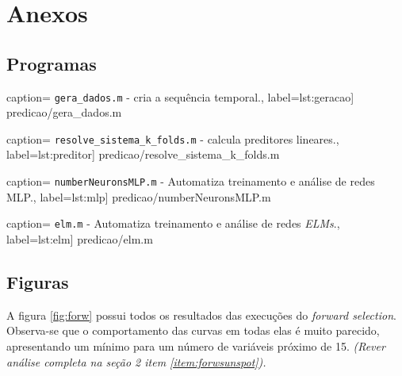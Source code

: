 \newpage

\section{Anexos}

\subsection {Programas}

 caption={ \texttt{gera\_dados.m} - cria a
		sequência temporal.}, label={lst:geracao}] {predicao/gera_dados.m}
		
 caption={
\texttt{resolve\_sistema\_k\_folds.m} - calcula preditores lineares.},
label={lst:preditor}] {predicao/resolve_sistema_k_folds.m}

 caption={ 
\texttt{numberNeuronsMLP.m} - Automatiza treinamento e análise de redes MLP.},
label={lst:mlp}] {predicao/numberNeuronsMLP.m}

 caption={ 
\texttt{elm.m} - Automatiza treinamento e análise de redes \textit{ELMs}.},
label={lst:elm}] {predicao/elm.m}
		
\FloatBarrier

\newpage

\subsection {Figuras}

A figura \ref{fig:forw} possui todos os resultados das execuções do
\textit{forward selection}. Observa-se que o comportamento das curvas em todas
elas é muito parecido, apresentando um mínimo para um número de variáveis
próximo de 15. \textit{(Rever análise completa na seção 2 item
\ref{item:forwsunspot}).}

